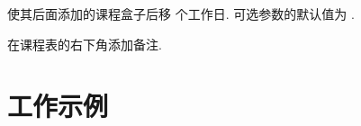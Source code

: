\documentclass[quiet, 10pt, letterpaper]{l3doc}
\begin{document}
\begin{function}{\newday}
  \begin{syntax}
     
  \end{syntax}
  使其后面添加的课程盒子后移  个工作日.
  可选参数的默认值为 .
\end{function}

\begin{function}{\more}
  \begin{syntax}
     
  \end{syntax}
  在课程表的右下角添加备注.
\end{function}

\clearpage \appendix

\section{工作示例} \label{mwe} \linespread{1.25}




\end{document}
